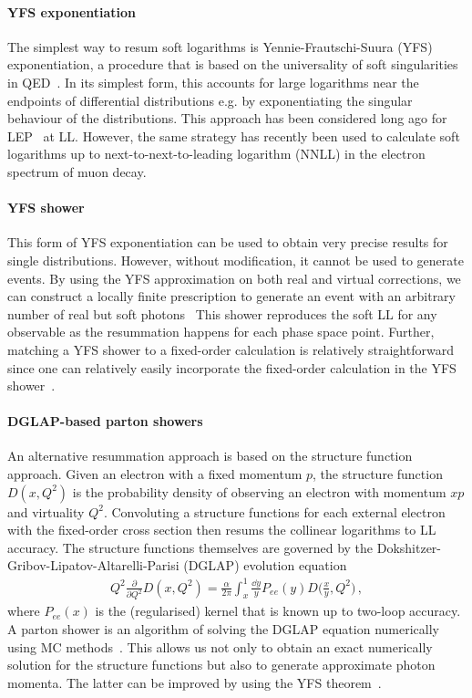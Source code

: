 \paragraph{YFS exponentiation}
The simplest way to resum soft logarithms is Yennie-Frautschi-Suura (YFS) exponentiation, a procedure that is based on the universality of soft singularities in QED~\cite{Yennie:1961ad}.
In its simplest form, this accounts for large logarithms near the endpoints of differential distributions e.g. by exponentiating the singular behaviour of the distributions.
This approach has been considered long ago for LEP~\cite{Kuraev:1985hb, Skrzypek:1992vk, Cacciari:1992pz} at LL.
However, the same strategy has recently been used to calculate soft logarithms up to next-to-next-to-leading logarithm (NNLL) in the electron spectrum of muon decay.

\paragraph{YFS shower}
This form of YFS exponentiation can be used to obtain very precise results for single distributions.
However, without modification, it cannot be used to generate events.
By using the YFS approximation on both real and virtual corrections, we can construct a locally finite prescription to generate an event with an arbitrary number of real but soft photons~\cite{Schonherr:2011vna}
This shower reproduces the soft LL for any observable as the resummation happens for each phase space point.
Further, matching a YFS shower to a fixed-order calculation is relatively straightforward since one can relatively easily incorporate the fixed-order calculation in the YFS shower~\cite{Schonherr:2011vna}.

\paragraph{DGLAP-based parton showers}
An alternative resummation approach is based on the structure function approach. 
Given an electron with a fixed momentum $p$, the structure function $D(x, Q^2)$ is the probability density of observing an electron with momentum $xp$ and virtuality $Q^2$.
Convoluting a structure functions for each external electron with the fixed-order cross section then resums the collinear logarithms to LL accuracy.
The structure functions themselves are governed by the Dokshitzer-Gribov-Lipatov-Altarelli-Parisi (DGLAP) evolution equation~\cite{Gribov:1972ri,Altarelli:1977zs,Dokshitzer:1977sg}
\begin{align}
    Q^2 \frac{\partial}{\partial Q^2} D(x,Q^2) = \frac{\alpha}{2\pi} \int_x^1 \frac{\dd y}{y} P_{ee}(y) D\Big(\frac xy, Q^2\Big)\,,
\end{align}
where $P_{ee}(x)$ is the (regularised) kernel that is known up to two-loop accuracy.
A parton shower is an algorithm of solving the DGLAP equation numerically using MC methods~\cite{Ellis:1996mzs}.
This allows us not only to obtain an exact numerically solution for the structure functions but also to generate approximate photon momenta.
The latter can be improved by using the YFS theorem~\cite{CarloniCalame:2001ny}.

